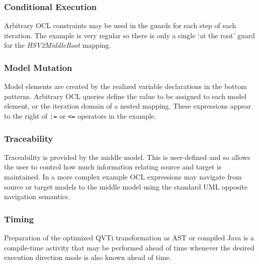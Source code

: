 \subsubsection{Conditional Execution}
Arbitrary OCL constraints may be used in the guards for each step of each iteration. The example is very regular so there is only a single `at the root' guard for the \textit{HSV2MiddleRoot} mapping.

\subsubsection{Model Mutation}
Model elements are created by the realized variable declarations in the bottom patterns. Arbitrary OCL queries define the value to be assigned to each model element, or the iteration domain of a nested mapping. These expressions appear to the right of \texttt{:=} or \texttt{<=} operators in the example.

\subsubsection{Traceability}
Traceability is provided by the middle model. This is user-defined and so allows the user to control how much information relating source and target is maintained. In a more complex example OCL expressions may navigate from source or target models to the middle model using the standard UML opposite navigation semantics.

\subsubsection{Timing}
Preparation of the optimized QVTi transformation as AST or compiled Java is a compile-time activity that may be performed ahead of time whenever the desired execution direction mode is also known ahead of time.



